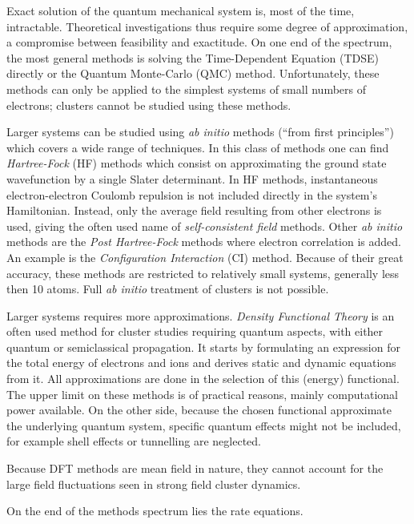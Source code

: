 Exact solution of the quantum mechanical system is, most of the time,
intractable. Theoretical investigations thus require some degree of
approximation, a compromise between feasibility and exactitude. On one end of
the spectrum, the most general methods is solving the
Time-Dependent \schrodinger Equation (TDSE) directly or the Quantum Monte-Carlo
(QMC) method. Unfortunately, these methods can only be applied to the simplest
systems of small numbers of electrons; clusters cannot be studied using these
methods.

Larger systems can be studied using \textit{ab initio} methods (``from
first principles'') which covers a wide range of techniques. In this class of
methods one can find \textit{Hartree-Fock} (HF) methods which consist on
approximating the ground state wavefunction by a single Slater determinant.
In HF methods, instantaneous electron-electron Coulomb repulsion is not
included directly in the system's Hamiltonian. Instead, only the average field
resulting from other electrons is used, giving the often used name of
\textit{self-consistent field} methods. Other \textit{ab
initio} methods are the \textit{Post Hartree-Fock} methods where electron
correlation is added. An example is the \textit{Configuration Interaction} (CI)
method. Because of their great accuracy, these methods are restricted to
relatively small systems, generally less then 10 atoms. Full \textit{ab initio}
treatment of clusters is not possible.

Larger systems requires more approximations. \textit{Density Functional Theory}
is an often used method for cluster studies requiring quantum aspects, with
either quantum or semiclassical propagation. It starts by formulating an
expression for the total energy of electrons and ions and derives static and
dynamic equations from it. All approximations are done in the selection of this
(energy) functional. The upper limit on these methods is of practical reasons,
mainly computational power available. On the other side, because the chosen
functional approximate the underlying quantum system, specific quantum effects
might not be included, for example shell effects or tunnelling are neglected.

Because DFT methods are mean field in nature, they cannot account for the large
field fluctuations seen in strong field cluster dynamics.

On the end of the methods spectrum lies the rate equations.






